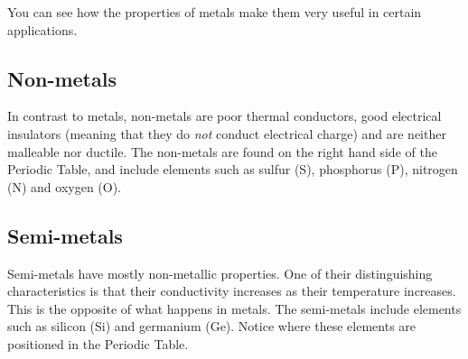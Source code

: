 You can see how the properties of metals make them very useful in certain applications.




\subsection{Non-metals}

In contrast to metals, non-metals are poor thermal conductors, good electrical insulators (meaning that they do \textit{not} conduct electrical charge) and are neither malleable nor ductile. The non-metals are found on the right hand side of the Periodic Table, and include elements such as sulfur (S), phosphorus (P), nitrogen (N) and oxygen (O).

\subsection{Semi-metals}

Semi-metals have mostly non-metallic properties. One of their distinguishing characteristics is that their conductivity increases as their temperature increases. This is the opposite of what happens in metals. The semi-metals include elements such as silicon (Si) and germanium (Ge). Notice where these elements are positioned in the Periodic Table. 



